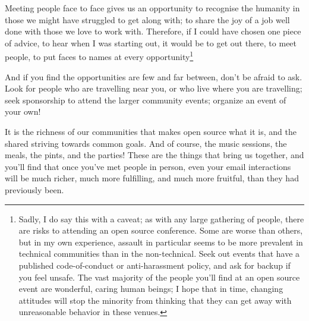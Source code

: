 Meeting people face to face gives us an opportunity to recognise the
humanity in those we might have struggled to get along with; to share
the joy of a job well done with those we love to work with. Therefore,
if I could have chosen one piece of advice, to hear when I was
starting out, it would be to get out there, to meet people, to put
faces to names at every opportunity\footnote{Sadly, I do say this with a caveat; as with any large gathering of
people, there are risks to attending an open source conference. Some
are worse than others, but in my own experience, assault in particular
seems to be more prevalent in technical communities than in the
non-technical. Seek out events that have a published code-of-conduct
or anti-harassment policy, and ask for backup if you feel unsafe. The
vast majority of the people you’ll find at an open source event are
wonderful, caring human beings; I hope that in time, changing
attitudes will stop the minority from thinking that they can get away
with unreasonable behavior in these venues.}

And if you find the opportunities are few and far between, don’t be
afraid to ask. Look for people who are travelling near you, or who
live where you are travelling; seek sponsorship to attend the larger
community events; organize an event of your own!

It is the richness of our communities that makes open source what it
is, and the shared striving towards common goals. And of course, the
music sessions, the meals, the pints, and the parties! These are the
things that bring us together, and you’ll find that once you’ve met
people in person, even your email interactions will be much richer,
much more fulfilling, and much more fruitful, than they had previously
been.
